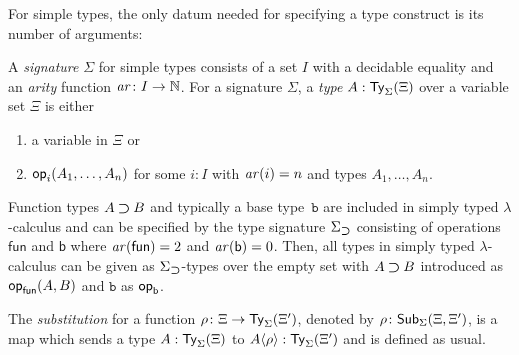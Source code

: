 For simple types, the only datum needed for specifying a type construct is its number of arguments:
\begin{definition} \label{def:simple-signature}
  A \emph{signature} $\Sigma$ for simple types consists of a set $I$ with a decidable equality and an \emph{arity} function $\mathit{ar}\colon I \to \mathbb{N}$.
  For a signature $\Sigma$, a \emph{type} $A : \mathsf{Ty}_{\Sigma}(\Xi)$ over a variable set $\Xi$ is either
  \begin{enumerate}
    \item a variable in $\Xi$ or
    \item $\mathsf{op}_{i}(A_1, \ldots, A_n)$ for some $i:I$ with $\mathit{ar}(i) = n$ and types $A_1,\ldots, A_n$.
  \end{enumerate}
\end{definition}

\begin{example} \label{ex:type-signature-for-function-type}
  Function types $A \mathbin{\bm{\supset}} B$ and typically a base type~$\mathtt{b}$ are included in simply typed $\lambda$-calculus and can be specified by the type signature $\Sigma_{\mathbin{\bm{\supset}}}$ consisting of operations $\mathsf{fun}$ and $\mathsf{b}$ where $\mathit{ar}(\mathsf{fun}) = 2$ and $\mathit{ar}(\mathsf{b}) = 0$.
  Then, all types in simply typed $\lambda$-calculus can be given as $\Sigma_{\mathbin{\bm{\supset}}}$-types over the empty set with $A \mathbin{\bm{\supset}} B$ introduced as $\mathsf{op}_{\mathsf{fun}}(A, B)$ and $\mathtt{b}$ as $\mathsf{op}_{\mathsf{b}}$. 
\end{example}

\begin{definition} \label{def:substitution}
The \emph{substitution} for a function $\rho\colon \Xi \to \mathsf{Ty}_{\Sigma}(\Xi')$, denoted by $\rho\colon \mathsf{Sub}_{\Sigma}(\Xi,\Xi')$, is a map which sends a type $A : \mathsf{Ty}_{\Sigma}(\Xi)$ to ${A}\!\left<{\rho}\right> : \mathsf{Ty}_{\Sigma}(\Xi')$ and is defined as usual.
\end{definition}

